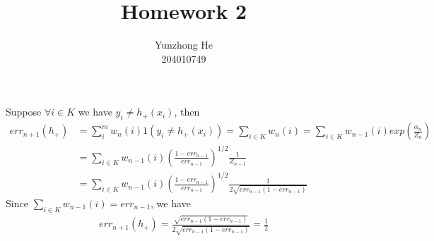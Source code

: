 \documentclass[12pt]{article}
\newenvironment{problem}[2][Problem]{\begin{trivlist}
\item[\hskip \labelsep {\bfseries #1}\hskip \labelsep {\bfseries #2}]}{\end{trivlist}}
\begin{document}
 
 
\title{Homework 2}%
\author{Yunzhong He\\ %
204010749} %
 
\maketitle
 
\begin{problem}{Problem 1}
\item{}
Suppose $\forall i \in K$ we have $y_i \neq h_+(x_i)$, then
\begin{align*}
	err_{n+1}(h_+) &= \sum_{i}^m w_n(i)1(y_i \neq h_+(x_i)) = \sum_{i \in K} w_n(i) 
     = \sum_{i \in K} w_{n-1}(i) exp(\frac{\alpha_n}{Z_n}) \\
    &= \sum_{i \in K} w_{n-1}(i) (\frac{1-err_{n-1}}{err_{n-1}})^{1/2} \frac{1}{Z_{n-1}} \\
    &= \sum_{i \in K} w_{n-1}(i) (\frac{1-err_{n-1}}{err_{n-1}})^{1/2} \frac{1}{2\sqrt{err_{n-1}(1-err_{n-1})}} 
\end{align*}
Since $\sum_{i \in K}w_{n-1}(i) = err_{n-1}$, we have
\begin{align*}
	err_{n+1}(h_+) = \frac{\sqrt{err_{n-1}(1-err_{n-1})}}{2\sqrt{err_{n-1}(1-err_{n-1})}} = \frac{1}{2}
\end{align*}
\end{problem}
\end{document}
